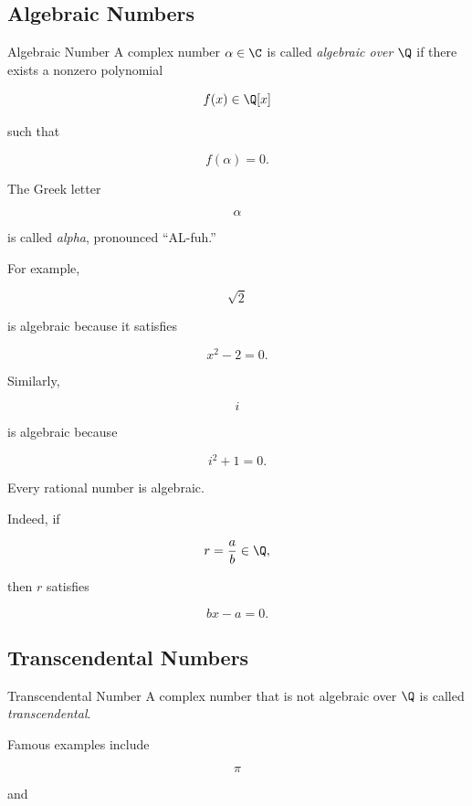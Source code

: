 \subsection{Algebraic Numbers}
\label{subsec:algebraic-numbers}

\begin{definitionbox}{Algebraic Number}
A complex number \(\alpha\in\C\) is called \emph{algebraic over \(\Q\)} if
there exists a nonzero polynomial

\[ f(x)\in\Q[x] \]

such that

\[ f(\alpha)=0. \]
\end{definitionbox}

The Greek letter

\[ \alpha \]

is called \emph{alpha}, pronounced ``AL-fuh.''

For example,

\[ \sqrt2 \]

is algebraic because it satisfies

\[ x^2-2=0. \]

Similarly,

\[ i \]

is algebraic because

\[ i^2+1=0. \]

Every rational number is algebraic.

Indeed, if

\[ r=\frac ab\in\Q, \]

then \(r\) satisfies

\[ bx-a=0. \]

\subsection{Transcendental Numbers}
\label{subsec:transcendental-numbers}

\begin{definitionbox}{Transcendental Number}
A complex number that is not algebraic over \(\Q\) is called
\emph{transcendental}.
\end{definitionbox}

Famous examples include

\[ \pi \]

and

